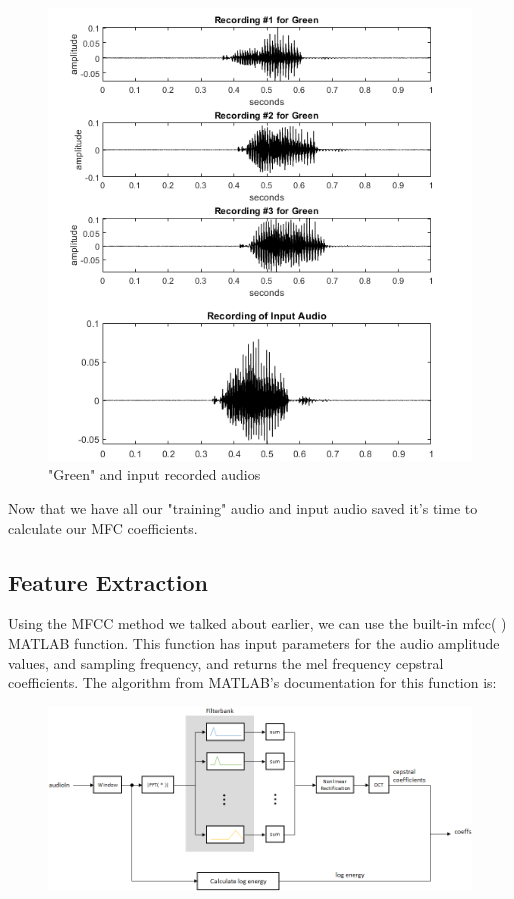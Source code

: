 \documentclass{article}
\begin{document}
\begin{figure}[H]
    \centering
    \includegraphics[width=\linewidth]{REC_GIN.png}
    \caption{"Green" and input recorded audios}
    \label{fig:MATLAB_GREENandINPUT}
\end{figure}

Now that we have all our "training" audio and input audio saved it's time to calculate our MFC coefficients.

\subsection{Feature Extraction}
Using the MFCC method we talked about earlier, we can use the built-in mfcc( ) MATLAB function. This function has input parameters for the audio amplitude values, and sampling frequency, and returns the mel frequency cepstral coefficients. The algorithm from MATLAB's documentation for this function is:

\begin{figure}[H]
    \centering
    \includegraphics[width=\linewidth]{MATLAB_mfcc.png}
    \caption{}
    \label{fig:MATLAB_mfcc}
\end{figure}
\end{document}
